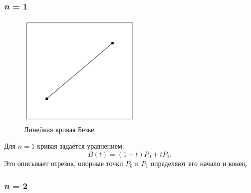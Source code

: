 \subsubsection*{\textit{n} = 1}
\begin{figure}[H]
    \begin{center}
        \begin{minipage}[h]{0.4\linewidth}
            \includegraphics[width=1\linewidth]{TrueType_1_Line.PNG}
            \caption{Линейная кривая Безье.}
            \label{ris:line}
        \end{minipage}
    \end{center}
\end{figure}
Для \(n = 1\) кривая задаётся уравнением:
\[
    B(t) = (1-t)P_0 + tP_1.
\]
Это описывает отрезок,  опорные точки \(P_0\) и \(P_1\) определяют его начало и конец.
\subsubsection*{\textit{n} = 2}

